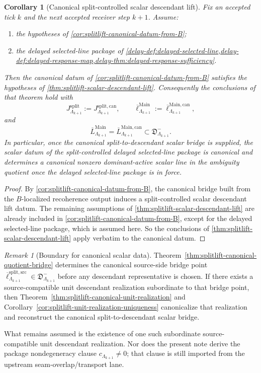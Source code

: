 \documentclass[11pt]{article}
\theoremstyle{definition}
\theoremstyle{plain}
\newtheorem{corollary}[definition]{Corollary}
\theoremstyle{remark}
\newtheorem{remark}[definition]{Remark}
\newcommand{\1}{\mathbf 1}
\begin{document}
\begin{corollary}[Canonical split-controlled scalar descendant lift]
\label{cor:splitlift-canonical-scalar-descendant-lift}
Fix an accepted tick \(k\) and the next accepted receiver step \(k+1\).
Assume:
\begin{enumerate}[leftmargin=2em]
\item the hypotheses of \cref{cor:splitlift-canonical-datum-from-B};
\item the delayed selected-line package of
  \cref{delay-def:delayed-selected-line,delay-def:delayed-response-map,delay-thm:delayed-response-sufficiency}.
\end{enumerate}
Then the canonical datum of \cref{cor:splitlift-canonical-datum-from-B} satisfies the hypotheses of
\cref{thm:splitlift-scalar-descendant-lift}.
Consequently the conclusions of that theorem hold with
\[
J^{\mathrm{split}}_{\Lambda_{k+1}}
:=
J^{\mathrm{split,can}}_{\Lambda_{k+1}},
\qquad
\overline\ell^{\mathrm{Main}}_{\Lambda_{k+1}}
:=
\overline\ell^{\mathrm{Main,can}}_{\Lambda_{k+1}},
\]
and
\[
\overline L^{\mathrm{Main}}_{\Lambda_{k+1}}
=
\overline L^{\mathrm{Main,can}}_{\Lambda_{k+1}}
\subset
\mathfrak D^-_{\Lambda_{k+1}}.
\]
In particular, once the canonical split-to-descendant scalar bridge is supplied, the scalar datum of
the split-controlled delayed selected-line package is canonical and determines a canonical nonzero
dominant-active scalar line in the ambiguity quotient once the delayed selected-line package is in
force.
\end{corollary}

\begin{proof}
By \cref{cor:splitlift-canonical-datum-from-B}, the canonical bridge built from the
\(B\)-localized recoherence output induces a split-controlled scalar descendant lift datum.
The remaining assumptions of \cref{thm:splitlift-scalar-descendant-lift} are already included in
\cref{cor:splitlift-canonical-datum-from-B}, except for the delayed selected-line package, which is
assumed here.
So the conclusions of \cref{thm:splitlift-scalar-descendant-lift} apply verbatim to the canonical
datum.
\end{proof}

\begin{remark}[Boundary for canonical scalar data]
\label{rem:splitlift-canonical-status}
Theorem~\cref{thm:splitlift-canonical-quotient-bridge} determines the canonical source-side bridge
point
\(
\overline\ell^{\mathrm{split,src}}_{\Lambda_{k+1}}
\in
\mathfrak D^-_{\Lambda_{k+1}}
\)
before any descendant representative is chosen.
If there exists a source-compatible unit descendant realization subordinate to that bridge point,
then
Theorem~\cref{thm:splitlift-canonical-unit-realization} and
Corollary~\cref{cor:splitlift-unit-realization-uniqueness}
canonicalize that realization and reconstruct the canonical split-to-descendant scalar bridge.

What remains assumed is the existence of one such subordinate source-compatible unit descendant
realization.
Nor does the present note derive the package nondegeneracy clause
\(
c_{\Lambda_{k+1}}\neq 0
\);
that clause is still imported from the upstream seam-overlap/transport lane.
\end{remark}
\end{document}
